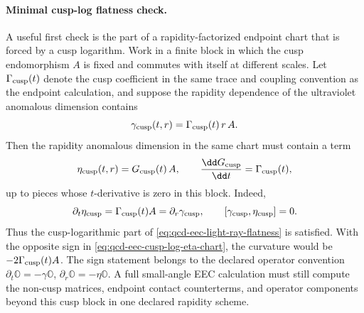 \paragraph{Minimal cusp-log flatness check.}
A useful first check is the part of a rapidity-factorized endpoint chart that
is forced by a cusp logarithm.  Work in a finite block in which the cusp
endomorphism \(A\) is fixed and commutes with itself at different scales.  Let
\(\Gamma_{\rm cusp}(t)\) denote the cusp coefficient in the same trace and
coupling convention as the endpoint calculation, and suppose the rapidity
dependence of the ultraviolet anomalous dimension contains
\begin{equation}
  \gamma_{\rm cusp}(t,r)
  =
  \Gamma_{\rm cusp}(t)\, r\, A .
  \label{eq:qcd-eec-cusp-log-gamma-chart}
\end{equation}
Then the rapidity anomalous dimension in the same chart must contain a term
\begin{equation}
  \eta_{\rm cusp}(t,r)
  =
  G_{\rm cusp}(t)\,A,
  \qquad
  \frac{\dd G_{\rm cusp}}{\dd t}=\Gamma_{\rm cusp}(t),
  \label{eq:qcd-eec-cusp-log-eta-chart}
\end{equation}
up to pieces whose \(t\)-derivative is zero in this block.  Indeed,
\[
  \partial_t\eta_{\rm cusp}
  =
  \Gamma_{\rm cusp}(t)A
  =
  \partial_r\gamma_{\rm cusp},
  \qquad
  [\gamma_{\rm cusp},\eta_{\rm cusp}]=0 .
\]
Thus the cusp-logarithmic part of
\eqref{eq:qcd-eec-light-ray-flatness} is satisfied.  With the opposite sign in
\eqref{eq:qcd-eec-cusp-log-eta-chart}, the curvature would be
\(-2\Gamma_{\rm cusp}(t)A\).  The sign statement belongs to the declared
operator convention \(\partial_t\mathbb O=-\gamma\mathbb O\),
\(\partial_r\mathbb O=-\eta\mathbb O\).  A full small-angle EEC calculation
must still compute the non-cusp matrices, endpoint contact counterterms, and
operator components beyond this cusp block in one declared rapidity scheme.

